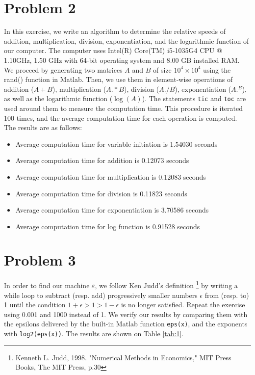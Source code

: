 \documentclass[11pt]{article}
\newcommand{\1}{\mathbbm{1}}
\newcounter{daggerfootnote}
\newcommand*{\daggerfootnote}[1]{%
	\setcounter{daggerfootnote}{\value{footnote}}%
	\renewcommand*{\thefootnote}{\fnsymbol{footnote}}%
	\footnote[2]{#1}%
	\setcounter{footnote}{\value{daggerfootnote}}%
	\renewcommand*{\thefootnote}{\arabic{footnote}}%
}
\begin{document}
	
\section*{Problem 2}
In this exercise, we write an algorithm to determine the relative speeds of addition, multiplication, division, exponentiation, and the logarithmic function of our computer. The computer uses Intel(R) Core(TM) i5-1035G4 CPU @ 1.10GHz, 1.50 GHz with 64-bit operating system and 8.00 GB installed RAM. We proceed by generating two matrices $A$ and $B$ of size $10^4\times10^4$ using the rand() function in Matlab. Then, we use them in element-wise operations of addition ($A+B$), multiplication ($A.*B$), division ($A./B$), exponentiation ($A.^B$), as well as the logarithmic function ($\log(A)$). The statements \texttt{tic} and \texttt{toc} are used around them to measure the computation time. This procedure is iterated 100 times, and the average computation time for each operation is computed. The results are as follows:
	\begin{itemize}
	\item Average computation time for variable initiation is 1.54030 seconds
	\item Average computation time for addition is 0.12073 seconds
	\item Average computation time for multiplication is 0.12083 seconds
	\item Average computation time for division is 0.11823 seconds
	\item Average computation time for exponentiation is 3.70586 seconds
	\item Average computation time for log function is 0.91528 seconds
	\end{itemize}
\section*{Problem 3}
	In order to find our machine $\varepsilon$, we follow Ken Judd's definition\daggerfootnote{Kenneth L. Judd, 1998. "Numerical Methods in Economics," MIT Press Books, The MIT Press, p.30} by writing a while loop to subtract (resp. add) progressively smaller numbers $\epsilon$ from (resp. to) 1 until the condition $1+\epsilon > 1 > 1-\epsilon$ is no longer satisfied. Repeat the exercise using 0.001 and 1000 instead of 1. We verify our results by comparing them with the epsilons delivered by the built-in Matlab function \texttt{eps(x)}, and the exponents with \texttt{log2(eps(x))}. The results are shown on Table \ref{tab:1}.
	
\end{document}
